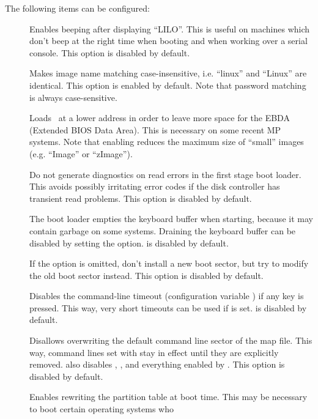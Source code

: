 The following items can be configured:
\begin{description}
  \item[] Enables beeping after displaying ``LILO''. This is
    useful on machines which don't beep at the right time when booting
    and when working over a serial
    console. This option is disabled by default.
  \item[] Makes image name matching case-insensitive, i.e.
    ``linux'' and ``Linux'' are identical. This option is enabled by
    default. Note that password matching is always case-sensitive.
  \item[] Loads \LILO\ at a lower address in order to
    leave more space for the EBDA (Extended BIOS Data Area). This is
    necessary on some recent MP systems. Note that enabling 
    reduces the maximum size of ``small'' images (e.g. ``Image'' or
    ``zImage'').
  \item[] Do not generate diagnostics on read errors in the
    first stage boot loader. This avoids possibly irritating error codes
    if the disk controller has transient read problems. This option is
    disabled by default.
  \item[] The boot loader empties the keyboard buffer
    when starting, because it may contain garbage on some systems. Draining
    the keyboard buffer can be disabled by setting the  option.
     is disabled by default.
  \item[] If the option  is omitted, don't install
    a new boot sector, but try to modify the old boot sector instead. This
    option is disabled by default.
  \item[] Disables the command-line timeout (configuration
    variable ) if any key is pressed. This way, very short
    timeouts can be used if  is set.  is disabled
    by default.
  \item[] Disallows overwriting the default command line sector
    of the map file. This way, command lines set with  stay in effect
    until they are explicitly removed.  also disables
    , , and everything enabled by
    . This option is disabled by default.
  \item[] Enables rewriting the partition table at boot
    time. This may be necessary to boot certain operating systems who

\end{description}
